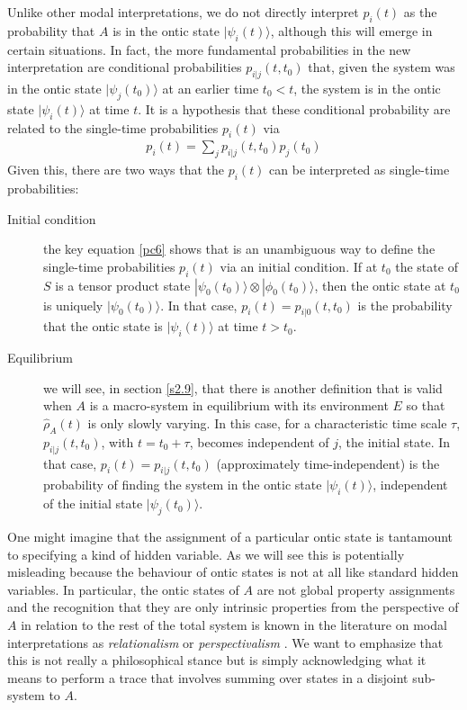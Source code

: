 \documentclass[%
preprint,
nofootinbib,
 amsmath,amssymb,
aps,
]{revtex4-1}
\def\ket#1{| #1\rangle}
\newcommand{\EQ}[1]{\begin{equation}\begin{split} #1
\end{split}\end{equation}}
\begin{document}
Unlike other modal interpretations, we do not directly interpret $p_i(t)$ as the probability that $A$ is in the ontic state $\ket{\psi_i(t)}$, although this will emerge in certain situations.
In fact, the more fundamental probabilities in the new interpretation are conditional probabilities $p_{i|j}(t,t_0)$ that, given the system was in the ontic state $\ket{\psi_j(t_0)}$ at an earlier time $t_0<t$, the system is in the ontic state $\ket{\psi_i(t)}$ at time $t$. It is a hypothesis that these conditional probability are related to the single-time probabilities $p_i(t)$ via
\EQ{
\boxed{p_i(t)=\sum_jp_{i|j}(t,t_0)p_j(t_0)}
\label{pc6}
}
Given this, there are two ways that the $p_i(t)$ can be interpreted as single-time probabilities:
\begin{description}
\item[Initial condition] the key equation \eqref{pc6} shows that is an
unambiguous way to define the single-time probabilities $p_i(t)$ via an initial condition.
If at $t_0$ the state of $S$ is a tensor product state $\ket{\psi_0(t_0)}\otimes\ket{\phi_0(t_0)}$, then the ontic state at $t_0$ is uniquely $\ket{\psi_0(t_0)}$. In that case, $p_i(t)=p_{i|0}(t,t_0)$ is the probability that the ontic state is $\ket{\psi_i(t)}$ at time $t>t_0$. 
\item[Equilibrium] we will see, in section \ref{s2.9}, that there is another definition that is valid when $A$ is a macro-system in equilibrium with its environment $E$ so that $\hat\rho_A(t)$ is only slowly varying. In this case, for a characteristic time scale $\tau$, $p_{i|j}(t,t_0)$, with $t=t_0+\tau$, becomes independent of $j$, the initial state. In that case, $p_i(t)=p_{i|j}(t,t_0)$ (approximately time-independent) is the probability of finding the system in the ontic state $\ket{\psi_i(t)}$, independent of the initial state $\ket{\psi_j(t_0)}$.
\end{description}

One might imagine that the assignment of a particular ontic state is tantamount to specifying a kind of hidden variable. As we will see this is potentially misleading because the behaviour of ontic states is not at all like standard hidden variables. In particular, the ontic states of $A$ are not global property assignments and the recognition that they are only intrinsic properties from the perspective of $A$ in relation to the rest of the total system
is known in the literature on modal interpretations as {\it relationalism\/} or {\it perspectivalism\/} \cite{BH,Rov,Dk1,BD1}. We want to emphasize that this is not really a philosophical stance but is 
simply acknowledging what it means to perform a trace that involves summing over states in a disjoint sub-system to $A$.
\end{document}
